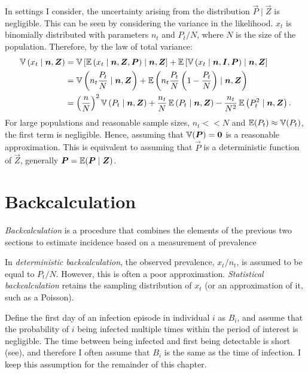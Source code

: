 \documentclass[thesis.tex]{subfiles}
\begin{document}
In settings I consider, the uncertainty arising from the distribution $\vec{P} \mid \vec{Z}$ is negligible.
This can be seen by considering the variance in the likelihood.
$x_t$ is binomially distributed with parameters $n_t$ and $P_t / N$, where $N$ is the size of the population.
Therefore, by the law of total variance:
\begin{align}
  \operatorname{\mathbb{V}}\left( x_t \mid \bm{n}, \bm{Z} \right)
    &= \operatorname{\mathbb{V}}\left[\operatorname{\mathbb{E}}\left( x_t \mid \bm{n}, \bm{Z}, \bm{P} \right) \mid \bm{n}, \bm{Z} \right] + \operatorname{\mathbb{E}}\left[\operatorname{\mathbb{V}}\left( x_t \mid \bm{n}, \bm{I}, \bm{P} \right) \mid \bm{n}, \bm{Z} \right] \\
    &= \operatorname{\mathbb{V}}\left( n_t \frac{P_t}{N} \mid \bm{n}, \bm{Z} \right) + \operatorname{\mathbb{E}}\left( n_t \frac{P_t}{N} \left(1 - \frac{P_t}{N} \right) \mid \bm{n}, \bm{Z} \right) \\
    &= \left( \frac{n}{N} \right)^2 \operatorname{\mathbb{V}}\left(P_t \mid \bm{n}, \bm{Z} \right) + \frac{n_t}{N} \operatorname{\mathbb{E}}\left(P_t \mid \bm{n}, \bm{Z} \right)  - \frac{n_t}{N^2} \operatorname{\mathbb{E}}\left(P_t^2 \mid \bm{n}, \bm{Z} \right).
\end{align}
For large populations and reasonable sample sizes, $n_t << N$ and $\operatorname{\mathbb{E}}(P_t) \approx \operatorname{\mathbb{V}}(P_t)$, the first term is negligible.
Hence, assuming that $\operatorname{\mathbb{V}}(\bm{P}) = \bm{0}$ is a reasonable approximation.
This is equivalent to assuming that $\vec{P}$ is a deterministic function of $\vec{Z}$, generally $\bm{P} = \operatorname{\mathbb{E}}( \bm{P} \mid \bm{Z})$.

\section{Backcalculation}

\emph{Backcalculation} is a procedure that combines the elements of the previous two sections to estimate incidence based on a measurement of prevalence

In \emph{deterministic backcalculation}, the observed prevalence, $x_t/n_t$, is assumed to be equal to $P_t/N$.
However, this is often a poor approximation.
\emph{Statistical backcalculation} retains the sampling distribution of $x_t$ (or an approximation of it, such as a Poisson).

Define the first day of an infection episode in individual $i$ as $B_i$, and assume that the probability of $i$ being infected multiple times within the period of interest is negligible.
The time between being infected and first being detectable is short (see), and therefore I often assume that $B_i$ is the same as the time of infection.
I keep this assumption for the remainder of this chapter.
\end{document}
